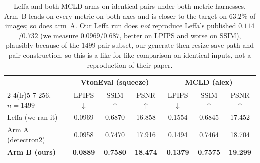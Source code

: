 \begin{table}[!tb]\centering\scriptsize\renewcommand{\arraystretch}{0.94}
\setlength{\tabcolsep}{4pt}
\begin{tabular}{@{}lcccccc@{}}
\toprule
 & \multicolumn{3}{c}{VtonEval (squeeze)} & \multicolumn{3}{c}{MCLD (alex)}\\
\cmidrule(lr){2-4}\cmidrule(lr){5-7}
$256$, $n{=}1499$ & LPIPS$\downarrow$ & SSIM$\uparrow$ & PSNR$\uparrow$ & LPIPS$\downarrow$ & SSIM$\uparrow$ & PSNR$\uparrow$\\
\midrule
Leffa (we ran it)  & 0.0969 & 0.6870 & 16.858 & 0.1554 & 0.6845 & 17.452\\
Arm A (detectron2) & 0.0958 & 0.7470 & 17.916 & 0.1494 & 0.7464 & 18.704\\
\textbf{Arm B (ours)} & \textbf{0.0889} & \textbf{0.7580} & \textbf{18.474} & \textbf{0.1379} & \textbf{0.7575} & \textbf{19.299}\\
\bottomrule
\end{tabular}
\caption{Leffa and both MCLD arms on identical pairs under both metric harnesses. Arm~B leads on
every metric on both axes and is closer to the target on $63.2\%$ of images; so does arm~A. Our
Leffa run does \emph{not} reproduce Leffa's published $0.114$/$0.732$ (we measure $0.0969$/$0.687$,
better on LPIPS and worse on SSIM), plausibly because of the $1499$-pair subset, our
generate-then-resize save path and pair construction, so this is a like-for-like comparison on
identical inputs, not a reproduction of their paper.}
\label{tab:leffa}
\end{table}
